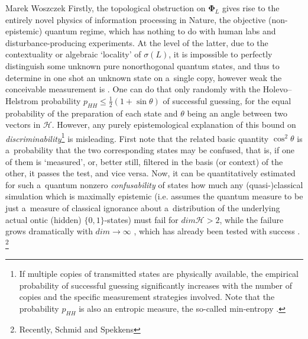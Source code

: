 \begin{artengenv}{Marek Woszczek}
Firstly, the topological obstruction on $\bm{\Phi}_L$ gives rise to the entirely novel physics of information processing in Nature, the objective (non-epistemic) quantum regime, which has nothing to do with human labs and disturbance-producing experiments. At the level of the latter, due to the contextuality or algebraic ‘locality' of $\sigma (L)$, it is impossible to perfectly distinguish some unknown pure nonorthogonal quantum states, and thus to determine in one shot an unknown state on a~single copy, however weak the conceivable measurement is
\parencite[][]{dariano_impossibility_1996}. %
 One can do that only randomly with the Holevo–Helstrom probability $p_{\mathit{HH}} \leq \frac{1}{2}(1+\sin \theta )$ of successful guessing, for the equal probability of the preparation of each state and $\theta $ being an angle between two vectors in $\mathcal{H}$. However, any purely epistemological explanation of this bound on \textit{discriminability}\footnote{If multiple copies of transmitted states are physically available, the empirical probability of successful guessing significantly increases with the number of copies and the specific measurement strategies involved. Note that the probability $p_{\mathit{HH}}$ is also an entropic measure, the so-called min-entropy 
\parencite[][]{konig_operational_2009}.%
 } is misleading. First note that the related basic quantity $\cos ^2\theta $ is a~probability that the two corresponding states may be confused, that is, if one of them is ‘measured', or, better still, filtered in the basis (or context) of the other, it passes the test, and vice versa. Now, it can be quantitatively estimated for such a~quantum nonzero \textit{confusability} of states how much any (quasi-)classical simulation which is maximally epistemic (i.e. assumes the quantum measure to be just a~measure of classical ignorance about a~distribution of the underlying actual ontic (hidden) $\{0,1\}$-states) must fail for $\mathit{dim} \mathcal{H} > 2$, while the failure grows dramatically with $\mathit{dim}\rightarrow {\infty}$ 
\parencites[][]{leifer_ensuremathpsi-epistemic_2014}[][]{barrett_no_2014}[][]{branciard_how_2014}, %
 which has already been tested with success 
\parencites[e.g.][]{ringbauer_measurements_2015}[][]{liao_experimental_2016}.%
\footnote{Recently, Schmid and Spekkens 
}
\end{artengenv}
